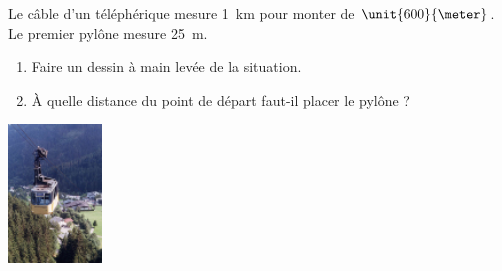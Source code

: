 
\begin{exercice}\label{exo2smath-0152}

    \begin{multicols}{2}
        Le câble d'un téléphérique mesure \SI{1}{\kilo\meter}  pour monter de \( \unit{600}{\meter}\). Le premier pylône mesure \SI{25}{\meter}.
    \begin{enumerate}
        \item
            Faire un dessin à main levée de la situation.
        \item
    À quelle distance du point de départ faut-il placer le pylône ?
    \end{enumerate}

    \columnbreak
    \includegraphics[width=2.5cm]{telepherique.pdf}
    \end{multicols}

\end{exercice}
